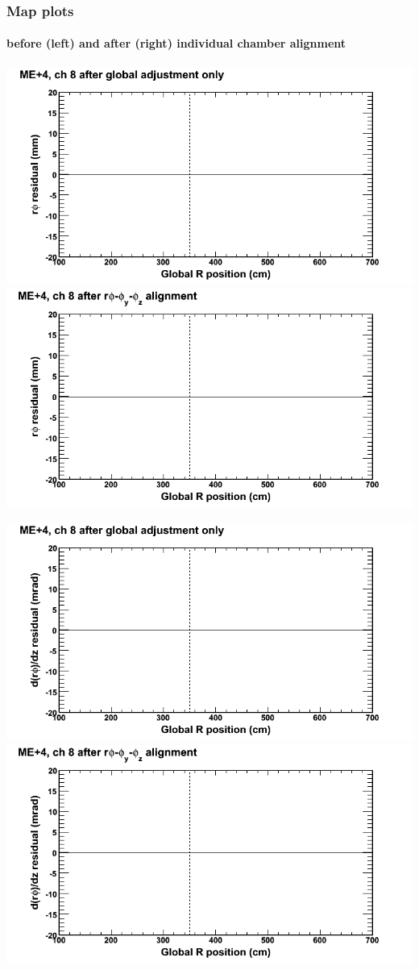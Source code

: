 \documentclass[compress]{beamer}
\begin{document}
\begin{frame}
\frametitle{Map plots}
\framesubtitle{before (left) and after (right) individual chamber alignment}
\includegraphics[width=0.5\linewidth]{ringmapplots_3dof/before_CSCvsr_mep4ch08_x.png} \includegraphics[width=0.5\linewidth]{ringmapplots_3dof/after_CSCvsr_mep4ch08_x.png}

\includegraphics[width=0.5\linewidth]{ringmapplots_3dof/before_CSCvsr_mep4ch08_dxdz.png} \includegraphics[width=0.5\linewidth]{ringmapplots_3dof/after_CSCvsr_mep4ch08_dxdz.png}
\end{frame}
\end{document}
